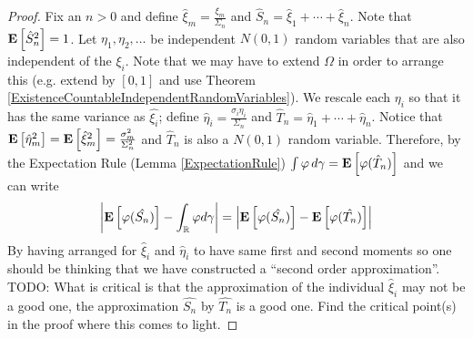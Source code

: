 \documentclass{amsart}
\theoremstyle{remark}
\theoremstyle{definition}
\begin{document}
\begin{proof}
Fix an $n >0$ and define $\hat{\xi}_m = \frac{\xi_m}{\Sigma_n}$ and
$\hat{S}_n = \hat{\xi}_1 + \cdots + \hat{\xi}_n$.  Note that
$\textbf{E}\left[\hat{S}_n^2\right] = 1$.  Let $\eta_1, \eta_2, \dots$ be independent $N(0,1)$ random variables
that are also independent of the $\xi_i$.  Note that we may have to
extend $\Omega$ in order to arrange this (e.g. extend by $[0,1]$ and
use Theorem \ref{ExistenceCountableIndependentRandomVariables}).  We
rescale each $\eta_i$ so that it has the same variance as
$\hat{\xi_i}$; define $\hat{\eta}_i =
\frac{\sigma_i \eta_i}{\Sigma_n}$ and $\hat{T}_n = \hat{\eta}_1 +
\cdots + \hat{\eta}_n$.  Notice that
$\textbf{E}\left[\hat{\eta}_m^2\right] =
\textbf{E}\left[\hat{\xi}_m^2\right] = \frac{\sigma_m^2}{\Sigma_n^2}$ and $\hat{T}_n$ is also a $N(0,1)$
random variable.  Therefore, by the Expectation Rule (Lemma
\ref{ExpectationRule}) $\int \varphi \, d\gamma =
\textbf{E}\left[\varphi(\hat{T}_n)\right]$ and we can write 
\begin{align*}
\left \lvert \textbf{E}\left[\varphi(\hat{S_n})\right] - \int_{\mathbb{R}} \varphi
  d\gamma \right \rvert = \left \lvert \textbf{E}\left[\varphi(\hat{S_n})\right] - \textbf{E}\left[\varphi(\hat{T_n})\right] \right \rvert
\end{align*}
By having arranged for $\hat{\xi}_i$ and $\hat{\eta}_i$ to have same
first and second moments so one should be thinking that we have
constructed a ``second order approximation''.  TODO: What is critical
is that the approximation of the individual $\hat{\xi}_i$ may not be a
good one, the approximation $\hat{S_n}$ by $\hat{T_n}$ is a good one.
Find the critical point(s) in the proof where this comes to light.


\end{proof}
\end{document}
